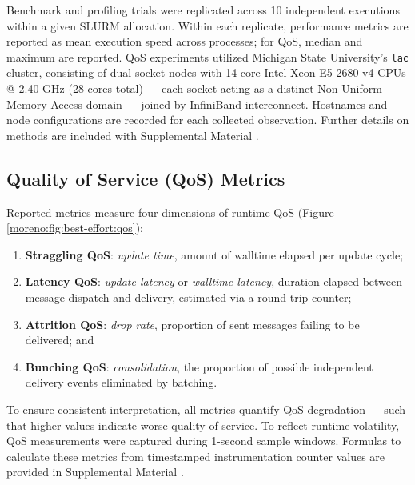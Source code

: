 Benchmark and profiling trials were replicated across 10 independent executions within a given SLURM allocation.
Within each replicate, performance metrics are reported as mean execution speed across processes; for QoS, median and maximum are reported.
QoS experiments utilized Michigan State University's \texttt{lac} cluster, consisting of dual-socket nodes with 14-core Intel Xeon E5-2680 v4 CPUs @ 2.40 GHz (28 cores total) --- each socket acting as a distinct Non-Uniform Memory Access domain --- joined by InfiniBand interconnect.
Hostnames and node configurations are recorded for each collected observation.
Further details on methods are included with Supplemental Material \cite{moreno_2026_trust}.

\vspace{-4.0ex}
\subsection{Quality of Service (QoS) Metrics}
\label{moreno:sec:case1:metrics}
\vspace{-2.0ex}

Reported metrics measure four dimensions of runtime QoS (Figure \ref{moreno:fig:best-effort:qos}):
\begin{enumerate}
\item \textbf{Straggling QoS}: \textit{update time}, amount of walltime elapsed per update cycle;
\item \textbf{Latency QoS}: \textit{update-latency} or \textit{walltime-latency}, duration elapsed between message dispatch and delivery, estimated via a round-trip counter;
\item \textbf{Attrition QoS}: \textit{drop rate}, proportion of sent messages failing to be delivered; and
\item \textbf{Bunching QoS}: \textit{consolidation}, the proportion of possible independent delivery events eliminated by batching.
\end{enumerate}

To ensure consistent interpretation, all metrics quantify QoS degradation --- such that higher values indicate worse quality of service.
To reflect runtime volatility, QoS measurements were captured during 1-second sample windows.
Formulas to calculate these metrics from timestamped instrumentation counter values are provided in Supplemental Material \cite{moreno_2026_trust}.


